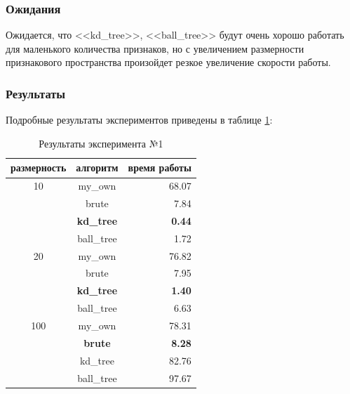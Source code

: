 \documentclass[a4paper, 12pt]{article}
\begin{document}
    \subsubsection{Ожидания}
    Ожидается, что <<kd\_tree>>, <<ball\_tree>> будут очень хорошо работать для маленького количества признаков, но с увеличением размерности признакового пространства произойдет резкое увеличение скорости работы.
    \subsubsection{Результаты}
    Подробные результаты экспериментов приведены в таблице \ref{exp1:table}:
    \\
        \begin{table}[h!]
            \begin{center}
                \caption{Результаты эксперимента №1} \label{exp1:table}
                \begin{tabular}{|c|c|r|} 
                    \hline 
                    размерность & алгоритм & время работы \\ 
                    \hline
                    10 & my\_own & 68.07 \\ 
                    \cline{2-3} 
                    & brute & 7.84 \\ 
                    \cline{2-3} 
                    & \textbf{kd\_tree} & \textbf{0.44} \\ 
                    \cline{2-3} 
                    & ball\_tree & 1.72 \\ 
                    \cline{2-3} 
                    \hline 
                    20 & my\_own & 76.82 \\ 
                    \cline{2-3}  
                    & brute & 7.95 \\ 
                    \cline{2-3}  
                    & \textbf{kd\_tree} & \textbf{1.40} \\ 
                    \cline{2-3} 
                    & ball\_tree & 6.63 \\ 
                    \hline 
                    100 & my\_own & 78.31 \\ 
                    \cline{2-3}  
                    & \textbf{brute} & \textbf{8.28} \\ 
                    \cline{2-3} 
                    & kd\_tree & 82.76 \\ 
                    \cline{2-3}
                    & ball\_tree & 97.67 \\
                    \hline
                \end{tabular} 
            \end{center}
        \end{table}
\end{document}
